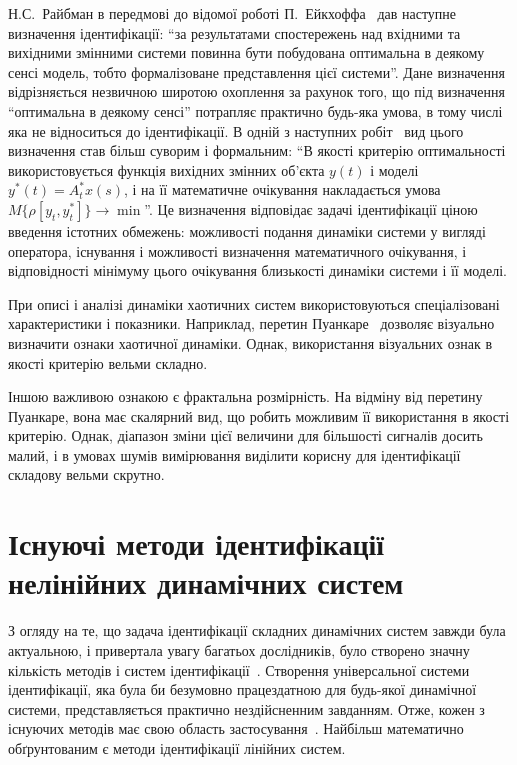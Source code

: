Н.С.~Райбман в передмові до відомої роботі
П.~Ейкхоффа~\cite{eykhoff_id_base} дав наступне визначення ідентифікації:
``за результатами спостережень над вхідними та вихідними
змінними системи повинна бути побудована оптимальна в
деякому сенсі модель, тобто формалізоване представлення цієї
системи''. Дане визначення відрізняється незвичною широтою
охоплення за рахунок того, що під визначення ``оптимальна в
деякому сенсі'' потрапляє практично будь-яка умова, в тому числі яка не
відноситься до ідентифікації. В одній з наступних
робіт~\cite{raibman_id_obj_ctl} вид цього визначення став більш суворим і
формальним: ``В якості критерію оптимальності використовується
функція вихідних змінних об'єкта
$y(t) $ і моделі
$y^{*}(t) = A_t^{*} x (s) $, і на її математичне очікування накладається
умова
$ M \{\rho [y_t, y_t^{*}] \} \to{\min} $''.
Це визначення
відповідає задачі ідентифікації ціною введення істотних
обмежень: можливості подання динаміки системи у вигляді
оператора, існування і можливості визначення математичного
очікування, і відповідності мінімуму цього очікування
близькості динаміки системи і її моделі.







При описі і аналізі динаміки хаотичних систем
використовуються спеціалізовані характеристики і
показники. Наприклад, перетин Пуанкаре~\cite{moon_chaotic_vibr,
anisch_complex_vibrations_in_simple_systems, atu_st105} дозволяє візуально визначити
ознаки хаотичної динаміки. Однак, використання візуальних
ознак в якості критерію вельми складно.

Іншою важливою ознакою є фрактальна розмірність. На відміну від
перетину Пуанкаре, вона має скалярний вид, що робить можливим
її використання в якості критерію. Однак, діапазон зміни цієї
величини для більшості сигналів досить малий, і в умовах шумів
вимірювання виділити корисну для ідентифікації складову
вельми скрутно.


\section{Існуючі методи ідентифікації нелінійних динамічних систем}%

З огляду на те, що задача ідентифікації складних динамічних
систем завжди була актуальною, і привертала увагу багатьох
дослідників, було створено значну кількість методів і систем
ідентифікації~\cite{eykhoff_id_base, leondes_modern_tu, nelles_nlsys_id}. Створення
універсальної системи ідентифікації, яка була би безумовно працездатною
для будь-якої динамічної системи, представляється практично
нездійсненним завданням. Отже, кожен з існуючих методів має
свою область застосування~\cite{rastr_intro}. Найбільш математично
обґрунтованим є методи ідентифікації лінійних систем.


